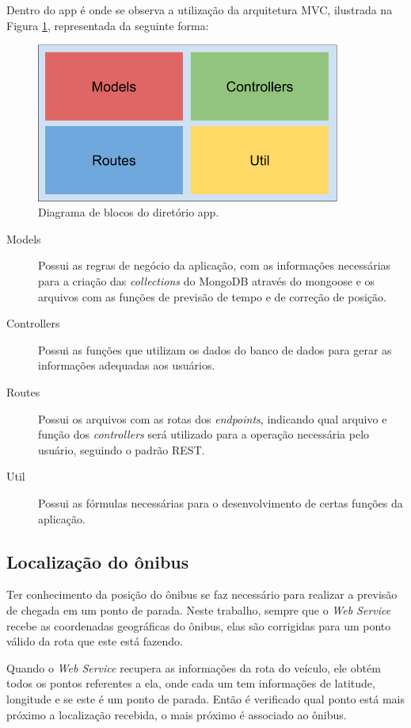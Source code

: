 \documentclass[
	12pt,				%
	oneside,			%
	a4paper,			%
	brazil				%
]{abntex2}
\begin{document}
Dentro do app é onde se observa a utilização da arquitetura MVC, ilustrada na Figura \ref{nodeapp}, representada da seguinte forma:

\begin{figure}[h]
\centering
\includegraphics[width=10cm, center]{images/brick_diagram_node_app}
\caption{Diagrama de blocos do diretório app.}
\label{nodeapp}
\end{figure}

\begin{description}
\item[Models] Possui as regras de negócio da aplicação, com as informações necessárias para a criação das \textit{collections} do MongoDB através do mongoose e os arquivos com as funções de previsão de tempo e de correção de posição.
\item[Controllers] Possui as funções que utilizam os dados do banco de dados para gerar as informações adequadas aos usuários.
\item[Routes] Possui os arquivos com as rotas dos \textit{endpoints}, indicando qual arquivo e função dos \textit{controllers} será utilizado para a operação necessária pelo usuário, seguindo o padrão REST.
\item[Util] Possui as fórmulas necessárias para o desenvolvimento de certas funções da aplicação. 
\end{description}

\subsection{Localização do ônibus}

Ter conhecimento da posição do ônibus se faz necessário para realizar a previsão de chegada em um ponto de parada. Neste trabalho, sempre que o \textit{Web Service} recebe as coordenadas geográficas do ônibus, elas são corrigidas para um ponto válido da rota que este está fazendo.

Quando o \textit{Web Service} recupera as informações da rota do veículo, ele obtém todos os pontos referentes a ela, onde cada um tem informações de latitude, longitude e se este é um ponto de parada. Então é verificado qual ponto está mais próximo a localização recebida, o mais próximo é associado ao ônibus.
\end{document}

